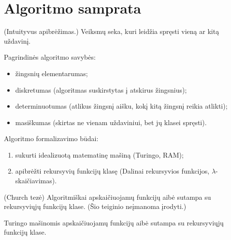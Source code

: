 \chapter{Algoritmo samprata}

\begin{defn}[Algoritmas]
  (Intuityvus apibrėžimas.) Veiksmų seka, kuri leidžia spręsti
  vieną ar kitą uždavinį.
\end{defn}

Pagrindinės algoritmo savybės:
\begin{itemize}
  \item žingsnių elementarumas;
  \item diskretumas (algoritmas suskirstytas į atskirus žingsnius);
  \item determinuotumas (atlikus žingsnį aišku, kokį kitą žingsnį 
    reikia atlikti);
  \item masiškumas (skirtas ne vienam uždaviniui, bet jų klasei 
    spręsti).
\end{itemize}

Algoritmo formalizavimo būdai:
\begin{enumerate}
  \item sukurti idealizuotą matematinę mašiną (Turingo, RAM);
  \item apibrėžti rekursyvių funkcijų klasę (Dalinai rekursyvios funkcijos,
    $\lambda$-skaičiavimas).
\end{enumerate}

\begin{prop}
  (Church tezė) Algoritmiškai apskaičiuojamų funkcijų aibė sutampa su 
  rekursyviųjų funkcijų klase. (Šio teiginio neįmanoma įrodyti.)
\end{prop}

\begin{prop}
  Turingo mašinomis apskaičiuojamų funkcijų aibė sutampa su rekursyviųjų
  funkcijų klase.
\end{prop}
